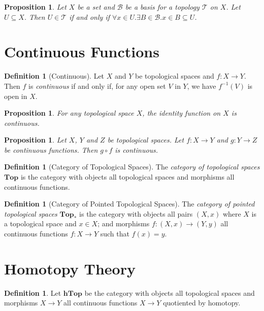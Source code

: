 \documentclass{book}
\newtheorem{proposition}[lemma]{Proposition}
\theoremstyle{definition}
\newtheorem{definition}[lemma]{Definition}
\newcommand{\BB}{\ensuremath{\mathcal{B}}}
\newcommand{\TT}{\ensuremath{\mathcal{T}}}
\newcommand{\inv}[1]{\ensuremath{{#1}^{-1}}}
\begin{document}
\begin{proposition}
    Let $X$ be a set and $\BB$ be a basis for a topology $\TT$ on $X$. Let $U \subseteq X$.
    Then $U \in \TT$ if and only if $\forall x \in U. \exists B \in \BB. x \in B \subseteq U$.
\end{proposition}

\section{Continuous Functions}

\begin{definition}[Continuous]
    Let $X$ and $Y$ be topological spaces and $f : X \rightarrow Y$. Then $f$ is \emph{continuous} if and only if, for any open set $V$
    in $Y$, we have $\inv{f}(V)$ is open in $X$.
\end{definition}

\begin{proposition}
    For any topological space $X$, the identity function on $X$ is continuous.
\end{proposition}

\begin{proposition}
    Let $X$, $Y$ and $Z$ be topological spaces. Let $f : X \rightarrow Y$ and $g : Y \rightarrow Z$ be continuous functions.
    Then $g \circ f$ is continuous.
\end{proposition}

\begin{definition}[Category of Topological Spaces]
    The \emph{category of topological spaces} $\mathbf{Top}$ is the category with objects all topological spaces and morphisms all
    continuous functions.
\end{definition}

\begin{definition}[Category of Pointed Topological Spaces]
    The \emph{category of pointed topological spaces} $\mathbf{Top}_*$ is the category with objects all pairs
    $(X,x)$ where $X$ is a topological space and $x \in X$; and morphisms $f : (X,x) \rightarrow (Y,y)$ all
    continuous functions $f : X \rightarrow Y$ such that $f(x) = y$.
\end{definition}

\section{Homotopy Theory}

\begin{definition}
    Let $\mathbf{hTop}$ be the category with objects all topological spaces and morphisms $X \rightarrow Y$
    all continuous functions $X \rightarrow Y$ quotiented by homotopy.
\end{definition}
\end{document}
